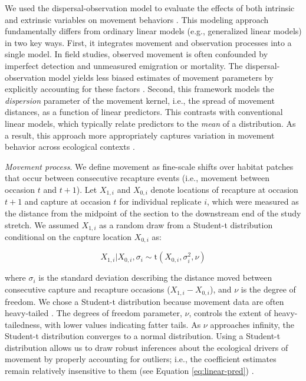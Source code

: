 \documentclass[11pt, class=article, crop=false]{standalone}
\begin{document}
We used the dispersal-observation model to evaluate the effects of both intrinsic and extrinsic variables on movement behaviors \citep{teruiModelingDispersalUsing2020, teruiNonrandomDispersalSympatric2021, teruiParasiteInfectionInduces2017, rodriguezRestrictedMovementStream2002, fujiwaraEstimationDispersalKernels2006}. This modeling approach fundamentally differs from ordinary linear models (e.g., generalized linear models) in two key ways. First, it integrates movement and observation processes into a single model. In field studies, observed movement is often confounded by imperfect detection and unmeasured emigration or mortality. The dispersal-observation model yields less biased estimates of movement parameters by explicitly accounting for these factors \citep{teruiModelingDispersalUsing2020}. Second, this framework models the \textit{dispersion} parameter of the movement kernel, i.e., the spread of movement distances, as a function of linear predictors. This contrasts with conventional linear models, which typically relate predictors to the \textit{mean} of a distribution. As a result, this approach more appropriately captures variation in movement behavior across ecological contexts \citep{teruiModelingDispersalUsing2020, pepinoFishDispersalFragmented2012, rodriguezRestrictedMovementStream2002}.

\textit{Movement process}. We define movement as fine-scale shifts over habitat patches that occur between consecutive recapture events (i.e., movement between occasion $t$ and $t+1$). Let $X_{1,i}$ and $X_{0,i}$ denote locations of recapture at occasion $t+1$ and capture at occasion $t$ for individual replicate $i$, which were measured as the distance from the midpoint of the section to the downstream end of the study stretch. We assumed $X_{1,i}$ as a random draw from a Student-t distribution conditional on the capture location $X_{0,i}$ as:    

\begin{equation}
    X_{1, i}|X_{0, i}, \sigma_i \sim \text{t}(X_{0, i}, \sigma_i^2, \nu)
    \label{eq:student-t}
\end{equation}

where $\sigma_i$ is the standard deviation describing the distance moved between consecutive capture and recapture occasions ($X_{1,i} - X_{0,i}$), and $\nu$ is the degree of freedom.
We chose a Student-t distribution because movement data are often heavy-tailed \citep{clobertDispersalEcologyEvolution2012}.
The degrees of freedom parameter, $\nu$, controls the extent of heavy-tailedness, with lower values indicating fatter tails. As $\nu$ approaches infinity, the Student-t distribution converges to a normal distribution.
Using a Student-t distribution allows us to draw robust inferences about the ecological drivers of movement by properly accounting for outliers; i.e., the coefficient estimates remain relatively insensitive to them (see Equation \ref{eq:linear-pred}) \citep{lunnBUGSBookPractical2012}.
\end{document}
